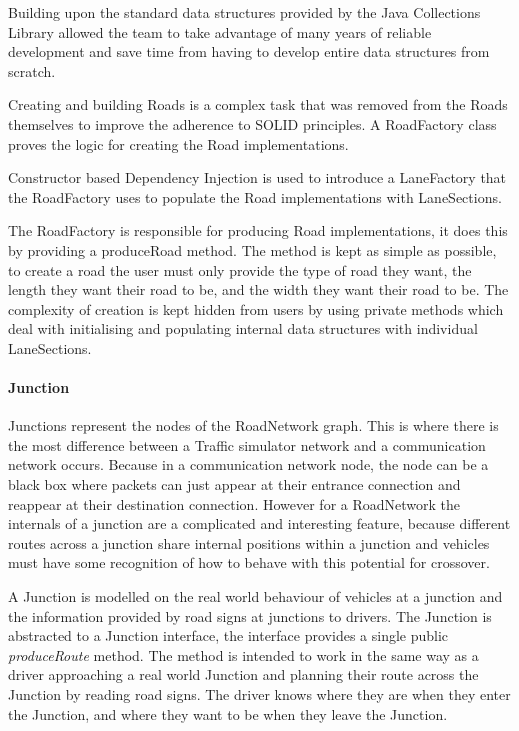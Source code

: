 \documentclass[11pt]{article}
\begin{document}
{\begin{itemize}
    Building upon the standard data structures provided by the Java Collections Library allowed the team to take advantage of many years of reliable development and save time from having to develop entire data structures from scratch.
    
    Creating and building Roads is a complex task that was removed from the Roads themselves to improve the adherence to SOLID principles. A RoadFactory class proves the logic for creating the Road implementations.
    
    Constructor based Dependency Injection is used to introduce a LaneFactory that the RoadFactory uses to populate the Road implementations with LaneSections.
    
    The RoadFactory is responsible for producing Road implementations, it does this by providing a produceRoad method. The method is kept as simple as possible, to create a road the user must only provide the type of road they want, the length they want their road to be, and the width they want their road to be. The complexity of creation is kept hidden from users by using private methods which deal with initialising and populating internal data structures with individual LaneSections.

    \paragraph{Junction}
    
    Junctions represent the nodes of the RoadNetwork graph. This is where there is the most difference between a Traffic simulator network and a communication network occurs. Because in a communication network node, the node can be a black box where packets can just appear at their entrance connection and reappear at their destination connection. However for a RoadNetwork the internals of a junction are a complicated and interesting feature, because different routes across a junction share internal positions within a junction and vehicles must have some recognition of how to behave with this potential for crossover.
    
    A Junction is modelled on the real world behaviour of vehicles at a junction and the information provided by road signs at junctions to drivers. The Junction is abstracted to a Junction interface, the interface provides a single public \textit{produceRoute} method. The method is intended to work in the same way as a driver approaching a real world Junction and planning their route across the Junction by reading road signs. The driver knows where they are when they enter the Junction, and where they want to be when they leave the Junction.
    

\end{itemize}}
\end{document}
